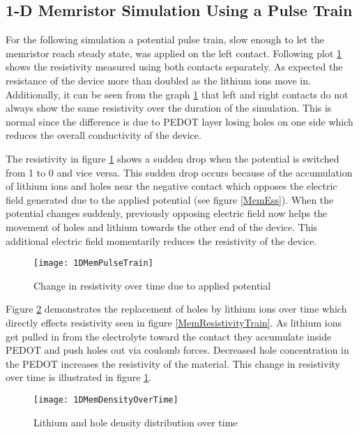 {\clearpage
\subsection{1-D Memristor Simulation Using a Pulse Train}
  
For the following simulation a potential pulse train, slow enough to let the memristor reach steady state, was applied on the left contact. Following plot \ref{MemResTrain} shows the resistivity measured using both contacts separately. As expected the resistance of the device more than doubled as the lithium ions move in. Additionally, it can be seen from the graph \ref{MemResTrain} that left and right contacts do not always show the same resistivity over the duration of the simulation. This is normal since the difference is due to PEDOT layer losing holes on one side which reduces the overall conductivity of the device. 

The resistivity in figure \ref{MemResTrain} shows a sudden drop when the potential is switched from 1 to 0 and vice versa. This sudden drop occurs because of the accumulation of lithium ions and holes near the negative contact which opposes the electric field generated due to the applied potential (see figure \ref{MemEss}). When the potential changes suddenly, previously opposing electric field now helps the movement of holes and lithium towards the other end of the device. This additional electric field momentarily reduces the resistivity of the device.

\begin{figure}[!htp]
\centering
\texttt{[image: 1DMemPulseTrain]}
\caption{Change in resistivity over time due to applied potential} 
\label{MemResTrain}
\end{figure}


\clearpage
Figure \ref{MempLi} demonstrates the replacement of holes by lithium ions over time which directly effects resistivity seen in figure \ref{MemResistivityTrain}.  As lithium ions get pulled in from the electrolyte toward the contact they accumulate inside PEDOT and push holes out via coulomb forces. Decreased hole concentration in the PEDOT increases the resistivity of the material. This change in resistivity over time is illustrated in figure \ref{MemResTrain}.

\begin{figure}[!htp]
\centering
\texttt{[image: 1DMemDensityOverTime]}
\caption{Lithium and hole density distribution over time} 
\label{MempLi}
\end{figure}

}
